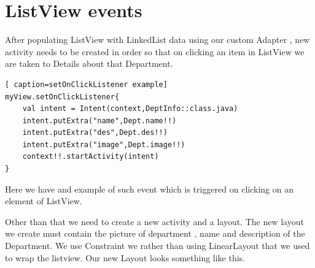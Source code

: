 \documentclass[11pt,a4paper]{report}
\begin{document}
\chapter{ListView events}

After populating ListView with LinkedList data using our custom Adapter , new activity needs
to be created in order so that on clicking an item in ListView we are taken to Details about
that Department.

\vspace{15pt}
\begin{lstlisting}[ caption=setOnClickListener example]
myView.setOnClickListener{
    val intent = Intent(context,DeptInfo::class.java)
    intent.putExtra("name",Dept.name!!)
    intent.putExtra("des",Dept.des!!)
    intent.putExtra("image",Dept.image!!)
    context!!.startActivity(intent)
}

\end{lstlisting}

Here we have and example of such event which is triggered on clicking on an element of ListView.

Other than that we need to create a new activity and a layout.
The new layout we create must contain the picture of department , name and description
of the Department.
We use Constraint we rather than using LinearLayout that we used to wrap the listview.
Our new Layout looks something like this.


\vspace{15pt}
\end{document}
